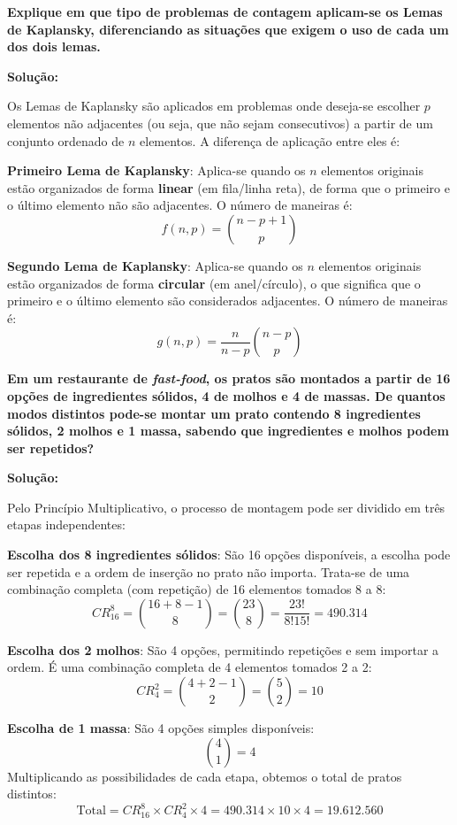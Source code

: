 \documentclass[a4paper,10pt,landscape,twocolumn]{article}  %
\let\oldenumerate\enumerate
\let\oldendenumerate\endenumerate
\renewenvironment{enumerate}{%
  \oldenumerate%
  \setlength{\itemsep}{1pt}%
  \setlength{\parskip}{0pt}%
  \setlength{\parsep}{0pt}%
  \setlength{\topsep}{2pt}%
  \setlength{\partopsep}{0pt}%
}{%
  \oldendenumerate%
}
\let\olditemize\itemize
\let\oldenditemize\enditemize
\renewenvironment{itemize}{%
  \olditemize%
  \setlength{\itemsep}{1pt}%
  \setlength{\parskip}{0pt}%
  \setlength{\parsep}{0pt}%
  \setlength{\topsep}{2pt}%
  \setlength{\partopsep}{0pt}%
}{%
  \oldenditemize%
}
\begin{document}
\begin{enumerate}
    \item \textbf{Explique em que tipo de problemas de contagem aplicam-se os Lemas de Kaplansky, diferenciando as situações que exigem o uso de cada um dos dois lemas.}
    
    \textbf{Solução:}
    
    Os Lemas de Kaplansky são aplicados em problemas onde deseja-se escolher $p$ elementos não adjacentes (ou seja, que não sejam consecutivos) a partir de um conjunto ordenado de $n$ elementos. A diferença de aplicação entre eles é:
    \begin{itemize}
        \item \textbf{Primeiro Lema de Kaplansky}: Aplica-se quando os $n$ elementos originais estão organizados de forma \textbf{linear} (em fila/linha reta), de forma que o primeiro e o último elemento não são adjacentes. O número de maneiras é:
        \[ f(n,p) = \binom{n-p+1}{p} \]
        \item \textbf{Segundo Lema de Kaplansky}: Aplica-se quando os $n$ elementos originais estão organizados de forma \textbf{circular} (em anel/círculo), o que significa que o primeiro e o último elemento são considerados adjacentes. O número de maneiras é:
        \[ g(n,p) = \frac{n}{n-p} \binom{n-p}{p} \]
    \end{itemize}

    \item \textbf{Em um restaurante de \textit{fast-food}, os pratos são montados a partir de 16 opções de ingredientes sólidos, 4 de molhos e 4 de massas. De quantos modos distintos pode-se montar um prato contendo 8 ingredientes sólidos, 2 molhos e 1 massa, sabendo que ingredientes e molhos podem ser repetidos?}
    
    \textbf{Solução:}
    
    Pelo Princípio Multiplicativo, o processo de montagem pode ser dividido em três etapas independentes:
    \begin{enumerate}
        \item \textbf{Escolha dos 8 ingredientes sólidos}: São 16 opções disponíveis, a escolha pode ser repetida e a ordem de inserção no prato não importa. Trata-se de uma combinação completa (com repetição) de 16 elementos tomados 8 a 8:
        \[ CR_{16}^8 = \binom{16+8-1}{8} = \binom{23}{8} = \frac{23!}{8!15!} = 490.314 \]
        \item \textbf{Escolha dos 2 molhos}: São 4 opções, permitindo repetições e sem importar a ordem. É uma combinação completa de 4 elementos tomados 2 a 2:
        \[ CR_{4}^2 = \binom{4+2-1}{2} = \binom{5}{2} = 10 \]
        \item \textbf{Escolha de 1 massa}: São 4 opções simples disponíveis:
        \[ \binom{4}{1} = 4 \]
    \end{enumerate}
    Multiplicando as possibilidades de cada etapa, obtemos o total de pratos distintos:
    \[ \text{Total} = CR_{16}^8 \times CR_{4}^2 \times 4 = 490.314 \times 10 \times 4 = 19.612.560 \]
    

\end{enumerate}
\end{document}
